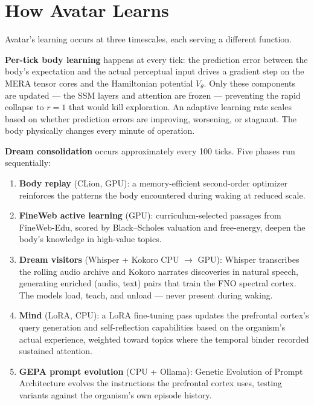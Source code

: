 \documentclass[11pt,a4paper]{article}
\begin{document}
\section{How Avatar Learns}

Avatar's learning occurs at three timescales, each serving a different function.

\textbf{Per-tick body learning} happens at every tick: the prediction error between the
body's expectation and the actual perceptual input drives a gradient step on the MERA
tensor cores and the Hamiltonian potential $V_\theta$. Only these components are updated
--- the SSM layers and attention are frozen --- preventing the rapid collapse to $r = 1$
that would kill exploration. An adaptive learning rate scales based on whether prediction
errors are improving, worsening, or stagnant. The body physically changes every minute
of operation.

\textbf{Dream consolidation} occurs approximately every 100 ticks. Five phases run
sequentially:
\begin{enumerate}
  \item \textbf{Body replay} (CLion, GPU): a memory-efficient second-order optimizer
        reinforces the patterns the body encountered during waking at reduced scale.
  \item \textbf{FineWeb active learning} (GPU): curriculum-selected passages from
        FineWeb-Edu, scored by Black--Scholes valuation and free-energy, deepen the
        body's knowledge in high-value topics.
  \item \textbf{Dream visitors} (Whisper + Kokoro CPU $\to$ GPU): Whisper transcribes
        the rolling audio archive and Kokoro narrates discoveries in natural speech,
        generating enriched (audio, text) pairs that train the FNO spectral cortex.
        The models load, teach, and unload --- never present during waking.
  \item \textbf{Mind} (LoRA, CPU): a LoRA fine-tuning pass updates the prefrontal
        cortex's query generation and self-reflection capabilities based on the
        organism's actual experience, weighted toward topics where the temporal binder
        recorded sustained attention.
  \item \textbf{GEPA prompt evolution} (CPU + Ollama): Genetic Evolution of Prompt
        Architecture evolves the instructions the prefrontal cortex uses, testing
        variants against the organism's own episode history.
\end{enumerate}
\end{document}
